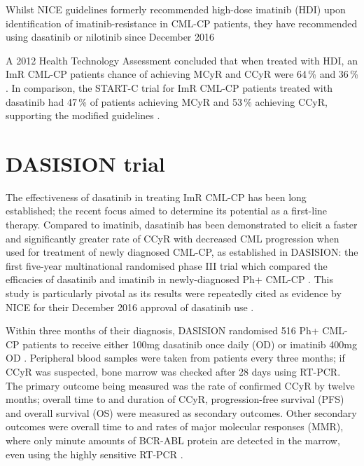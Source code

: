 Whilst NICE guidelines formerly recommended high-dose imatinib (HDI) upon identification of imatinib-resistance in CML-CP patients, they have recommended using dasatinib or nilotinib since December 2016 \citep{RefWorks:doc:583b55b1e4b066125b2158e1,RefWorks:doc:585a6ecce4b08f4705f3869d}

A 2012 Health Technology Assessment concluded that when treated with HDI, an ImR CML-CP patient\textquotesingle s chance of achieving MCyR and CCyR were 64\,\% and 36\,\% \citep{RefWorks:doc:583dbc80e4b066125b21f1e0}. In comparison, the START-C trial for ImR CML-CP patients treated with dasatinib had 47\,\% of patients achieving MCyR and 53\,\% achieving CCyR, supporting the modified guidelines \citep{RefWorks:doc:583f7741e4b0c3b530630106}.

\section{DASISION trial}

The effectiveness of dasatinib in treating ImR CML-CP has been long established; the recent focus aimed to determine its potential as a first-line therapy. Compared to imatinib, dasatinib has been demonstrated to elicit a faster and significantly greater rate of CCyR with decreased CML progression when used for treatment of newly diagnosed CML-CP, as established in DASISION: the first five-year multinational randomised phase III trial which compared the efficacies of dasatinib and imatinib in newly-diagnosed Ph+ CML-CP \citep{RefWorks:doc:58403a89e4b088d36ea8c1b1,RefWorks:doc:58564bd8e4b0f87b6b283223}. This study is particularly pivotal as its results were repeatedly cited as evidence by NICE for their December 2016 approval of dasatinib use \citep{RefWorks:doc:585a6f1ee4b02418eb47cc08}.

Within three months of their diagnosis, DASISION randomised 516 Ph+ CML-CP patients to receive either 100mg dasatinib once daily (OD) or imatinib 400mg OD \citep{RefWorks:doc:58564bd8e4b0f87b6b283223}. Peripheral blood samples were taken from patients every three months; if CCyR was suspected, bone marrow was checked after 28 days using RT-PCR. The primary outcome being measured was the rate of confirmed CCyR by twelve months; overall time to and duration of CCyR, progression-free survival (PFS) and overall survival (OS) were measured as secondary outcomes. Other secondary outcomes were overall time to and rates of major molecular responses (MMR), where only minute amounts of BCR-ABL protein are detected in the marrow, even using the highly sensitive RT-PCR \citep{RefWorks:doc:59ac1d9fe4b0eb7a8e729b18}.

